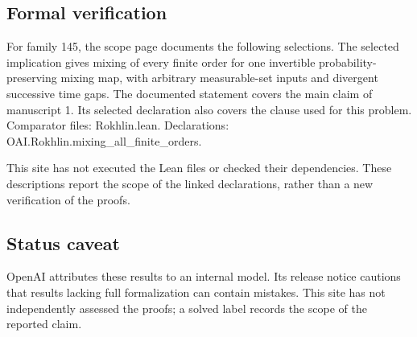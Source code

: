 \documentclass[11pt]{article}
\begin{document}
\subsection{Formal verification}
For family 145, the scope page documents the following selections. The selected implication gives mixing of every finite order for one invertible probability-preserving mixing map, with arbitrary measurable-set inputs and divergent successive time gaps. The documented statement covers the main claim of manuscript 1. Its selected declaration also covers the clause used for this problem. Comparator files: Rokhlin.lean. Declarations: OAI.Rokhlin.mixing\_all\_finite\_orders.

This site has not executed the Lean files or checked their dependencies. These descriptions report the scope of the linked declarations, rather than a new verification of the proofs.

\subsection{Status caveat}
OpenAI attributes these results to an internal model. Its release notice cautions that results lacking full formalization can contain mistakes. This site has not independently assessed the proofs; a solved label records the scope of the reported claim.
\end{document}
